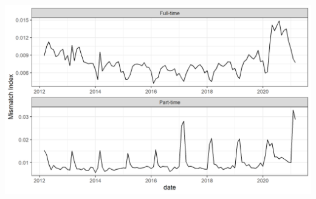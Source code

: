 \documentclass[
]{book}
\begin{document}
\includegraphics[width=32.4in]{R/figure/occ_mismatch}

  
\end{document}
